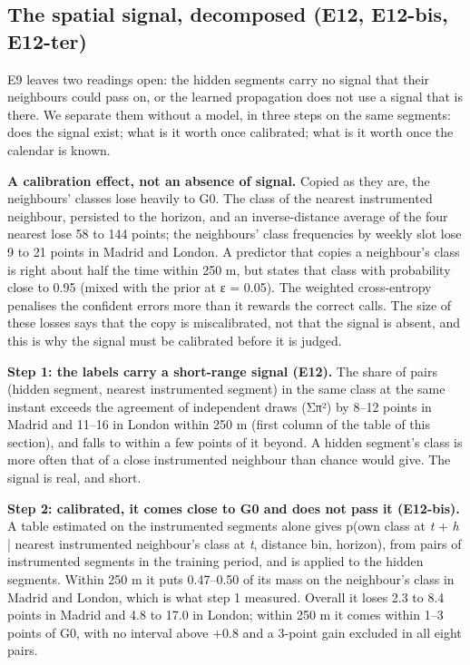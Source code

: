 \subsection{The spatial signal, decomposed (E12, E12-bis, E12-ter)}
E9 leaves two readings open: the hidden segments carry no signal that their neighbours could pass on, or the learned propagation does not use a signal that is there. We separate them without a model, in three steps on the same segments: does the signal exist; what is it worth once calibrated; what is it worth once the calendar is known.

\textbf{A calibration effect, not an absence of signal.} Copied as they are, the neighbours' classes lose heavily to G0. The class of the nearest instrumented neighbour, persisted to the horizon, and an inverse-distance average of the four nearest lose 58 to 144 points; the neighbours' class frequencies by weekly slot lose 9 to 21 points in Madrid and London. A predictor that copies a neighbour's class is right about half the time within 250 m, but states that class with probability close to 0.95 (mixed with the prior at ε = 0.05). The weighted cross-entropy penalises the confident errors more than it rewards the correct calls. The size of these losses says that the copy is miscalibrated, not that the signal is absent, and this is why the signal must be calibrated before it is judged.

\textbf{Step 1: the labels carry a short-range signal (E12).} The share of pairs (hidden segment, nearest instrumented segment) in the same class at the same instant exceeds the agreement of independent draws (Σπ²) by 8–12 points in Madrid and 11–16 in London within 250 m (first column of the table of this section), and falls to within a few points of it beyond. A hidden segment's class is more often that of a close instrumented neighbour than chance would give. The signal is real, and short.

\textbf{Step 2: calibrated, it comes close to G0 and does not pass it (E12-bis).} A table estimated on the instrumented segments alone gives p(own class at \emph{t} + \emph{h} | nearest instrumented neighbour's class at \emph{t}, distance bin, horizon), from pairs of instrumented segments in the training period, and is applied to the hidden segments. Within 250 m it puts 0.47–0.50 of its mass on the neighbour's class in Madrid and London, which is what step 1 measured. Overall it loses 2.3 to 8.4 points in Madrid and 4.8 to 17.0 in London; within 250 m it comes within 1–3 points of G0, with no interval above +0.8 and a 3-point gain excluded in all eight pairs.

